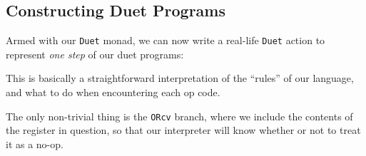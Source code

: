\documentclass[]{article}
\newenvironment{Shaded}{}{}
\newcommand{\KeywordTok}[1]{\textcolor[rgb]{0.00,0.44,0.13}{\textbf{#1}}}
\newcommand{\DataTypeTok}[1]{\textcolor[rgb]{0.56,0.13,0.00}{#1}}
\newcommand{\DecValTok}[1]{\textcolor[rgb]{0.25,0.63,0.44}{#1}}
\newcommand{\CommentTok}[1]{\textcolor[rgb]{0.38,0.63,0.69}{\textit{#1}}}
\newcommand{\OtherTok}[1]{\textcolor[rgb]{0.00,0.44,0.13}{#1}}
\newcommand{\FunctionTok}[1]{\textcolor[rgb]{0.02,0.16,0.49}{#1}}
\newcommand{\NormalTok}[1]{#1}
\begin{document}
\subsection{Constructing Duet Programs}\label{constructing-duet-programs}

Armed with our \texttt{Duet} monad, we can now write a real-life \texttt{Duet}
action to represent \emph{one step} of our duet programs:

\begin{Shaded}
\end{Shaded}

This is basically a straightforward interpretation of the ``rules'' of our
language, and what to do when encountering each op code.

The only non-trivial thing is the \texttt{ORcv} branch, where we include the
contents of the register in question, so that our interpreter will know whether
or not to treat it as a no-op.
\end{document}
